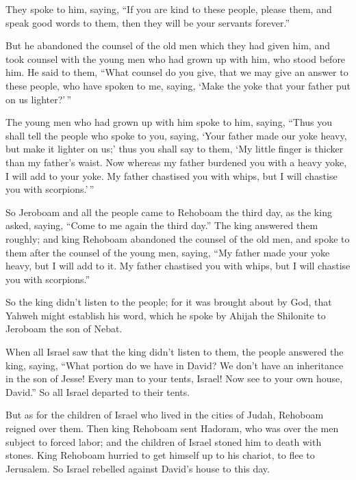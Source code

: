  They spoke to him, saying, ``If you are kind to these
people, please them, and speak good words to them, then they will be
your servants forever.''

 But he abandoned the counsel of the old men which they
had given him, and took counsel with the young men who had grown up with
him, who stood before him.  He said to them, ``What
counsel do you give, that we may give an answer to these people, who
have spoken to me, saying, `Make the yoke that your father put on us
lighter?'\,''

 The young men who had grown up with him spoke to him,
saying, ``Thus you shall tell the people who spoke to you, saying, `Your
father made our yoke heavy, but make it lighter on us;' thus you shall
say to them, `My little finger is thicker than my father's waist.
 Now whereas my father burdened you with a heavy yoke, I
will add to your yoke. My father chastised you with whips, but I will
chastise you with scorpions.'\,''

 So Jeroboam and all the people came to Rehoboam the
third day, as the king asked, saying, ``Come to me again the third
day.''  The king answered them roughly; and king Rehoboam
abandoned the counsel of the old men,  and spoke to them
after the counsel of the young men, saying, ``My father made your yoke
heavy, but I will add to it. My father chastised you with whips, but I
will chastise you with scorpions.''

 So the king didn't listen to the people; for it was
brought about by God, that Yahweh might establish his word, which he
spoke by Ahijah the Shilonite to Jeroboam the son of Nebat.

 When all Israel saw that the king didn't listen to them,
the people answered the king, saying, ``What portion do we have in
David? We don't have an inheritance in the son of Jesse! Every man to
your tents, Israel! Now see to your own house, David.'' So all Israel
departed to their tents.

 But as for the children of Israel who lived in the
cities of Judah, Rehoboam reigned over them.  Then king
Rehoboam sent Hadoram, who was over the men subject to forced labor; and
the children of Israel stoned him to death with stones. King Rehoboam
hurried to get himself up to his chariot, to flee to Jerusalem.
 So Israel rebelled against David's house to this day.


